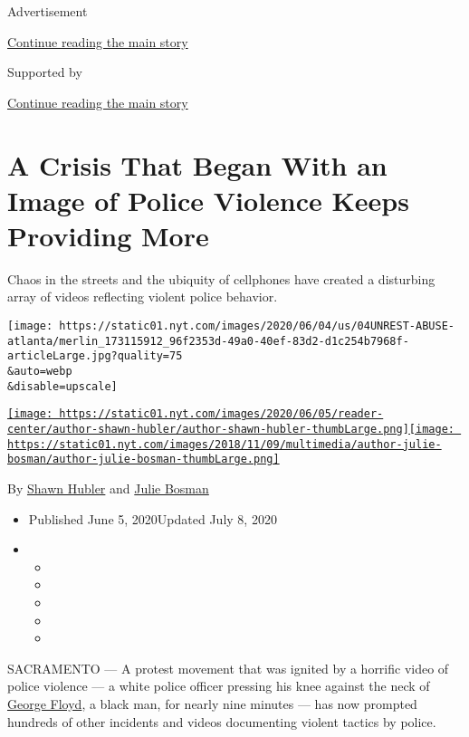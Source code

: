 Advertisement

\protect\hyperlink{after-top}{Continue reading the main story}

Supported by

\protect\hyperlink{after-sponsor}{Continue reading the main story}

\hypertarget{a-crisis-that-began-with-an-image-of-police-violence-keeps-providing-more}{%
\section{A Crisis That Began With an Image of Police Violence Keeps
Providing
More}\label{a-crisis-that-began-with-an-image-of-police-violence-keeps-providing-more}}

Chaos in the streets and the ubiquity of cellphones have created a
disturbing array of videos reflecting violent police behavior.

\texttt{[image: https://static01.nyt.com/images/2020/06/04/us/04UNREST-ABUSE-atlanta/merlin\_173115912\_96f2353d-49a0-40ef-83d2-d1c254b7968f-articleLarge.jpg?quality=75\\\&auto=webp\\\&disable=upscale]}

\href{https://www.nytimes.com/by/shawn-hubler}{\texttt{[image: https://static01.nyt.com/images/2020/06/05/reader-center/author-shawn-hubler/author-shawn-hubler-thumbLarge.png]}}\href{https://www.nytimes.com/by/julie-bosman}{\texttt{[image: https://static01.nyt.com/images/2018/11/09/multimedia/author-julie-bosman/author-julie-bosman-thumbLarge.png]}}

By \href{https://www.nytimes.com/by/shawn-hubler}{Shawn Hubler} and
\href{https://www.nytimes.com/by/julie-bosman}{Julie Bosman}

\begin{itemize}
\item
  Published June 5, 2020Updated July 8, 2020
\item
  \begin{itemize}
  \item
  \item
  \item
  \item
  \item
  \end{itemize}
\end{itemize}

SACRAMENTO --- A protest movement that was ignited by a horrific video
of police violence --- a white police officer pressing his knee against
the neck of
\href{https://www.nytimes.com/2020/07/08/us/george-floyd-body-camera-transcripts.html}{George
Floyd}, a black man, for nearly nine minutes --- has now prompted
hundreds of other incidents and videos documenting violent tactics by
police.

